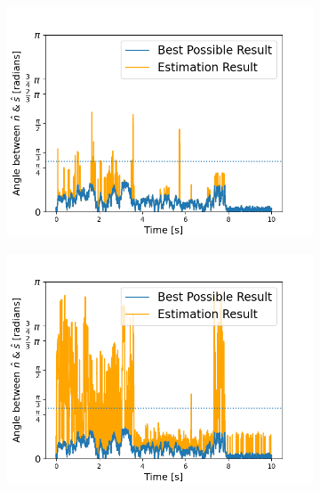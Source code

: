 \documentclass[final,  3p]{elsarticle}
\begin{document}
\begin{figure}[h]
\centering
\begin{subfigure}{0.32\textwidth}
	\subcaption{}
	\includegraphics[width=\textwidth]{./Images/fig7a.png}
\end{subfigure}
\begin{subfigure}{0.32\textwidth}
	\subcaption{}
	\includegraphics[width=\textwidth]{./Images/fig7b.png}
\end{subfigure}
\begin{subfigure}{0.32\textwidth}
	\subcaption{}

\end{subfigure}
\end{figure}
\end{document}
